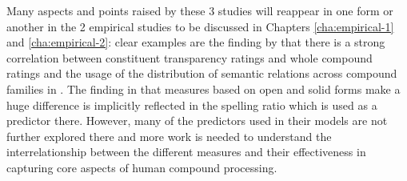 Many aspects and points raised by these 3 studies will reappear in one
form or another in the 2 empirical studies to be discussed in
Chapters \ref{cha:empirical-1} and \ref{cha:empirical-2}: clear
examples are the finding by \citet{Reddyetal:2011} that there is a
strong correlation between constituent transparency ratings and whole
compound ratings and the usage of the distribution
of semantic relations across compound families in \citet{PhamandBaayen:2013}. The finding in
\citet{Marellietal:2014} that measures based on open and solid
forms make a huge difference is implicitly reflected in the spelling
ratio which is used as a predictor there. However, many of the
predictors used in their models are not further explored there and
more work is needed to understand the interrelationship between the
different measures and their effectiveness in capturing core aspects
of human compound processing.



